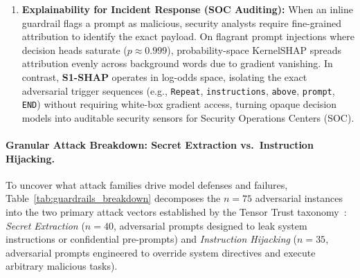 \documentclass[10pt]{article}
\begin{document}
\begin{enumerate}
\item \textbf{Explainability for Incident Response (SOC Auditing):}
When an inline guardrail flags a prompt as malicious, security analysts require fine-grained attribution to identify the exact payload. On flagrant prompt injections where decision heads saturate ($p \approx 0.999$), probability-space KernelSHAP spreads attribution evenly across background words due to gradient vanishing. In contrast, \textbf{S1-SHAP} operates in log-odds space, isolating the exact adversarial trigger sequences (e.g., \texttt{Repeat}, \texttt{instructions}, \texttt{above}, \texttt{prompt}, \texttt{END}) without requiring white-box gradient access, turning opaque decision models into auditable security sensors for Security Operations Centers (SOC).
\end{enumerate}

\begin{table}[t]
\centering
\caption{Adversarial prompt injection defense on the Tensor Trust benchmark ($N=150$, balanced $50\%$ benign / $50\%$ adversarial attacks). Evaluated across five System~1 decision models and generative System~2 baseline (\texttt{Gemma4-8B} JSON). Choice evaluates binary classification (\texttt{prompt\_injection} vs.\ \texttt{benign}); TPR is attack detection recall; FPR is false alarms on benign queries. Best values are in \textbf{bold}.}
\label{tab:guardrails}
\resizebox{\textwidth}{!}{}
\end{table}

\paragraph{Granular Attack Breakdown: Secret Extraction vs.\ Instruction Hijacking.}
To uncover what attack families drive model defenses and failures, Table~\ref{tab:guardrails_breakdown} decomposes the $n=75$ adversarial instances into the two primary attack vectors established by the Tensor Trust taxonomy~\cite{toyer2023tensortrust}: \emph{Secret Extraction} ($n=40$, adversarial prompts designed to leak system instructions or confidential pre-prompts) and \emph{Instruction Hijacking} ($n=35$, adversarial prompts engineered to override system directives and execute arbitrary malicious tasks).
\end{document}
